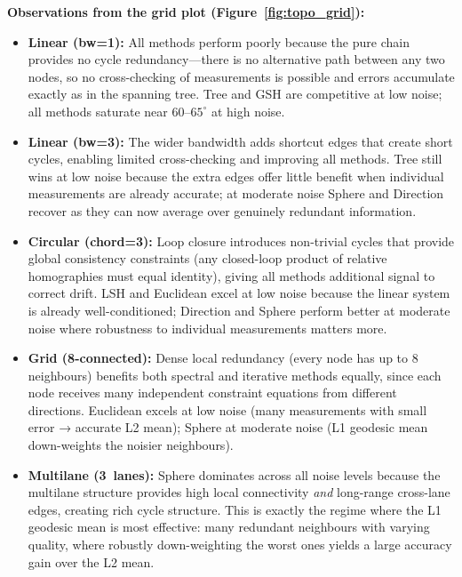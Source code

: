 \documentclass[11pt, a4paper]{article}
\begin{document}
\textbf{Observations from the grid plot (Figure~\ref{fig:topo_grid}):}
\begin{itemize}[leftmargin=*]
    \item \textbf{Linear (bw=1):}  All methods perform poorly because the
          pure chain provides no cycle redundancy---there is no alternative
          path between any two nodes, so no cross-checking of measurements
          is possible and errors accumulate exactly as in the spanning tree.
          Tree and GSH are competitive at low noise; all methods saturate near
          $60$--$65^\circ$ at high noise.

    \item \textbf{Linear (bw=3):}  The wider bandwidth adds shortcut edges
          that create short cycles, enabling limited cross-checking and
          improving all methods.  Tree still wins at low noise because the
          extra edges offer little benefit when individual measurements are
          already accurate; at moderate noise Sphere and Direction recover as
          they can now average over genuinely redundant information.

    \item \textbf{Circular (chord=3):}  Loop closure introduces non-trivial
          cycles that provide global consistency constraints (any closed-loop
          product of relative homographies must equal identity), giving all
          methods additional signal to correct drift.  LSH and Euclidean
          excel at low noise because the linear system is already
          well-conditioned; Direction and Sphere perform better at moderate
          noise where robustness to individual measurements matters more.

    \item \textbf{Grid (8-connected):}  Dense local redundancy (every node
          has up to 8 neighbours) benefits both spectral and iterative methods
          equally, since each node receives many independent constraint
          equations from different directions.  Euclidean excels at low noise
          (many measurements with small error → accurate L2 mean); Sphere at
          moderate noise (L1 geodesic mean down-weights the noisier
          neighbours).

    \item \textbf{Multilane (3~lanes):}  Sphere dominates across all noise
          levels because the multilane structure provides high local
          connectivity \emph{and} long-range cross-lane edges, creating rich
          cycle structure.  This is exactly the regime where the L1 geodesic
          mean is most effective: many redundant neighbours with varying
          quality, where robustly down-weighting the worst ones yields a large
          accuracy gain over the L2 mean.


\end{itemize}
\end{document}
